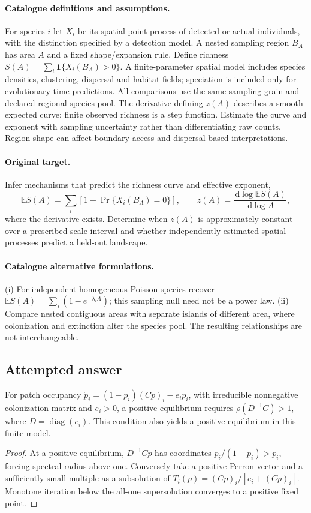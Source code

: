 \documentclass[11pt]{article}
\begin{document}
\paragraph{Catalogue definitions and assumptions.}
For species $i$ let $X_i$ be its spatial point process of detected or actual individuals, with the distinction specified by a detection model. A nested sampling region $B_A$ has area $A$ and a fixed shape/expansion rule. Define richness $S(A)=\sum_i\mathbf1\{X_i(B_A)>0\}$. A finite-parameter spatial model includes species densities, clustering, dispersal and habitat fields; speciation is included only for evolutionary-time predictions. All comparisons use the same sampling grain and declared regional species pool. The derivative defining $z(A)$ describes a smooth expected curve; finite observed richness is a step function. Estimate the curve and exponent with sampling uncertainty rather than differentiating raw counts. Region shape can affect boundary access and dispersal-based interpretations.
\paragraph{Original target.}
Infer mechanisms that predict the richness curve and effective exponent,
\[
 \mathbb{E} S(A)=\sum_i[1-\Pr\{X_i(B_A)=0\}],\qquad
 z(A)=\frac{\,\mathrm{d}\log\mathbb{E} S(A)}{\,\mathrm{d}\log A},
\]
where the derivative exists. Determine when $z(A)$ is approximately constant over a prescribed scale interval and whether independently estimated spatial processes predict a held-out landscape.
\paragraph{Catalogue alternative formulations.}
(i) For independent homogeneous Poisson species recover $\mathbb{E} S(A)=\sum_i(1-e^{-\lambda_iA})$; this sampling null need not be a power law. (ii) Compare nested contiguous areas with separate islands of different area, where colonization and extinction alter the species pool. The resulting relationships are not interchangeable.
\subsection{Attempted answer}
\begin{proposition}
For patch occupancy $\dot p_i=(1-p_i)(Cp)_i-e_ip_i$, with irreducible nonnegative colonization matrix and $e_i>0$, a positive equilibrium requires $\rho(D^{-1}C)>1$, where $D=\operatorname{diag}(e_i)$. This condition also yields a positive equilibrium in this finite model.
\end{proposition}
\begin{proof}
At a positive equilibrium, $D^{-1}Cp$ has coordinates $p_i/(1-p_i)>p_i$, forcing spectral radius above one. Conversely take a positive Perron vector and a sufficiently small multiple as a subsolution of $T_i(p)=(Cp)_i/[e_i+(Cp)_i]$. Monotone iteration below the all-one supersolution converges to a positive fixed point.
\end{proof}
\end{document}
